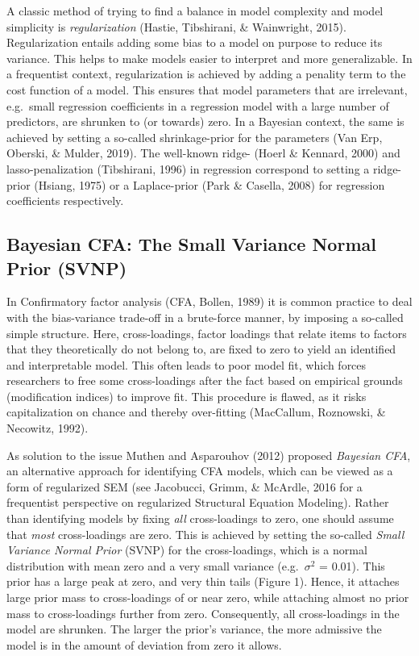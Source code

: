 \documentclass[
  man,floatsintext]{apa6}
\begin{document}
A classic method of trying to find a balance in model complexity and model simplicity is \emph{regularization} (Hastie, Tibshirani, \& Wainwright, 2015). Regularization entails adding some bias to a model on purpose to reduce its variance. This helps to make models easier to interpret and more generalizable. In a frequentist context, regularization is achieved by adding a penality term to the cost function of a model. This ensures that model parameters that are irrelevant, e.g.~small regression coefficients in a regression model with a large number of predictors, are shrunken to (or towards) zero. In a Bayesian context, the same is achieved by setting a so-called shrinkage-prior for the parameters (Van Erp, Oberski, \& Mulder, 2019). The well-known ridge- (Hoerl \& Kennard, 2000) and lasso-penalization (Tibshirani, 1996) in regression correspond to setting a ridge-prior (Hsiang, 1975) or a Laplace-prior (Park \& Casella, 2008) for regression coefficients respectively.

\hypertarget{bayesian-cfa-the-small-variance-normal-prior-svnp}{%
\subsection{Bayesian CFA: The Small Variance Normal Prior (SVNP)}\label{bayesian-cfa-the-small-variance-normal-prior-svnp}}

In Confirmatory factor analysis (CFA, Bollen, 1989) it is common practice to deal with the bias-variance trade-off in a brute-force manner, by imposing a so-called simple structure. Here, cross-loadings, factor loadings that relate items to factors that they theoretically do not belong to, are fixed to zero to yield an identified and interpretable model. This often leads to poor model fit, which forces researchers to free some cross-loadings after the fact based on empirical grounds (modification indices) to improve fit. This procedure is flawed, as it risks capitalization on chance and thereby over-fitting (MacCallum, Roznowski, \& Necowitz, 1992).

As solution to the issue Muthen and Asparouhov (2012) proposed \emph{Bayesian CFA}, an alternative approach for identifying CFA models, which can be viewed as a form of regularized SEM (see Jacobucci, Grimm, \& McArdle, 2016 for a frequentist perspective on regularized Structural Equation Modeling). Rather than identifying models by fixing \emph{all} cross-loadings to zero, one should assume that \emph{most} cross-loadings are zero. This is achieved by setting the so-called \emph{Small Variance Normal Prior} (SVNP) for the cross-loadings, which is a normal distribution with mean zero and a very small variance (e.g.~\(\sigma^2\) = 0.01). This prior has a large peak at zero, and very thin tails (Figure 1). Hence, it attaches large prior mass to cross-loadings of or near zero, while attaching almost no prior mass to cross-loadings further from zero. Consequently, all cross-loadings in the model are shrunken. The larger the prior's variance, the more admissive the model is in the amount of deviation from zero it allows.
\end{document}

